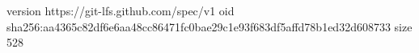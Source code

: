 version https://git-lfs.github.com/spec/v1
oid sha256:aa4365c82df6e6aa48cc86471fc0bae29c1e93f683df5affd78b1ed32d608733
size 528
